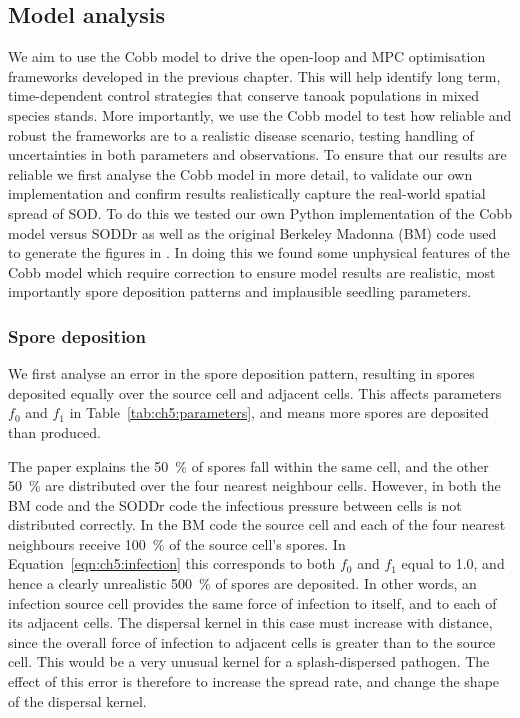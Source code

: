 \subsection{Model analysis\label{sec:ch5:model_analysis}}

We aim to use the Cobb model to drive the open-loop and MPC optimisation frameworks developed in the previous chapter. This will help identify long term, time-dependent control strategies that conserve tanoak populations in mixed species stands. More importantly, we use the Cobb model to test how reliable and robust the frameworks are to a realistic disease scenario, testing handling of uncertainties in both parameters and observations. To ensure that our results are reliable we first analyse the Cobb model in more detail, to validate our own implementation and confirm results realistically capture the real-world spatial spread of SOD\@. To do this we tested our own Python implementation of the Cobb model versus SODDr as well as the original Berkeley Madonna (BM) code used to generate the figures in \citet{cobb_ecosystem_2012}. In doing this we found some unphysical features of the Cobb model which require correction to ensure model results are realistic, most importantly spore deposition patterns and implausible seedling parameters.

\subsubsection{Spore deposition}

We first analyse an error in the spore deposition pattern, resulting in spores deposited equally over the source cell and adjacent cells. This affects parameters $f_0$ and $f_1$ in Table~\ref{tab:ch5:parameters}, and means more spores are deposited than produced.

The paper explains the \SI{50}{\percent} of spores fall within the same cell, and the other \SI{50}{\percent} are distributed over the four nearest neighbour cells. However, in both the BM code and the SODDr code the infectious pressure between cells is not distributed correctly. In the BM code the source cell and each of the four nearest neighbours receive \SI{100}{\percent} of the source cell's spores. In Equation~\ref{eqn:ch5:infection} this corresponds to both $f_0$ and $f_1$ equal to \num{1.0}, and hence a clearly unrealistic \SI{500}{\percent} of spores are deposited. In other words, an infection source cell provides the same force of infection to itself, and to each of its adjacent cells. The dispersal kernel in this case must increase with distance, since the overall force of infection to adjacent cells is greater than to the source cell. This would be a very unusual kernel for a splash-dispersed pathogen. The effect of this error is therefore to increase the spread rate, and change the shape of the dispersal kernel.

